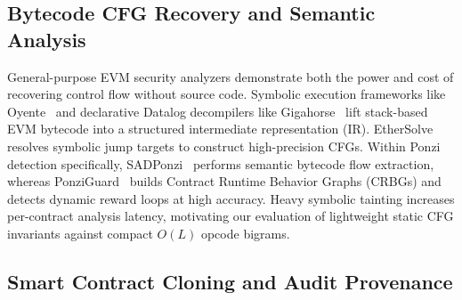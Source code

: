 \documentclass[conference]{IEEEtran}
\begin{document}
\subsection{Bytecode CFG Recovery and Semantic Analysis}\label{sec:related_cfg}

General-purpose EVM security analyzers demonstrate both the power and cost of recovering control flow without source code. Symbolic execution frameworks like Oyente~\cite{luu2016oyente} and declarative Datalog decompilers like Gigahorse~\cite{grech2019gigahorse} lift stack-based EVM bytecode into a structured intermediate representation (IR). EtherSolve~\cite{contro2021ethersolve} resolves symbolic jump targets to construct high-precision CFGs\@. Within Ponzi detection specifically, SADPonzi~\cite{chen2021sadponzi} performs semantic bytecode flow extraction, whereas PonziGuard~\cite{liang2024ponziguard,liang2025crbg} builds Contract Runtime Behavior Graphs (CRBGs) and detects dynamic reward loops at high accuracy. Heavy symbolic tainting increases per-contract analysis latency, motivating our evaluation of lightweight static CFG invariants against compact $O(L)$ opcode bigrams.

\subsection{Smart Contract Cloning and Audit Provenance}\label{sec:related_prov}
\end{document}
